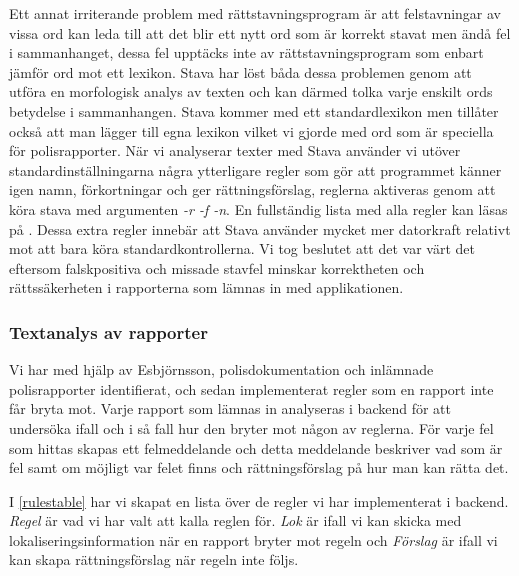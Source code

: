\documentclass[swedish]{maucsthesis}
\begin{document}
Ett annat irriterande problem med rättstavningsprogram är att felstavningar av
vissa ord kan leda till att det blir ett nytt ord som är korrekt stavat men ändå
fel i sammanhanget, dessa fel upptäcks inte av rättstavningsprogram som enbart
jämför ord mot ett lexikon. Stava har löst båda dessa problemen genom att utföra
en morfologisk analys av texten och kan därmed tolka varje enskilt ords
betydelse i sammanhangen. Stava kommer med ett standardlexikon men tillåter
också att man lägger till egna lexikon vilket vi gjorde med ord som är speciella
för polisrapporter. När vi analyserar texter med Stava använder vi utöver
standardinställningarna några ytterligare regler som gör att programmet känner igen
namn, förkortningar och ger rättningsförslag, reglerna aktiveras genom att köra stava med 
argumenten \textit{-r -f -n}. En fullständig lista med alla regler kan läsas på \cite{kann:2016}. Dessa extra regler innebär att
Stava använder mycket mer datorkraft relativt mot att bara köra
standardkontrollerna. Vi tog beslutet att det var värt det eftersom
falskpositiva och missade stavfel minskar korrektheten och rättssäkerheten i
rapporterna som lämnas in med applikationen. 

\subsubsection{Textanalys av rapporter}\label{textanalysavrapporter}

Vi har med hjälp av Esbjörnsson, polisdokumentation och inlämnade polisrapporter identifierat, och sedan implementerat
regler som en rapport inte får bryta mot. Varje rapport som lämnas in analyseras i backend för att undersöka
ifall och i så fall hur den bryter mot någon av reglerna.
För varje fel som hittas skapas ett felmeddelande och detta meddelande beskriver vad som är fel
samt om möjligt var felet finns och rättningsförslag på hur man kan rätta det.

I \cref{rulestable} har vi skapat en lista över de regler vi har implementerat i backend.
\textit{Regel} är vad vi har valt att kalla reglen för. \textit{Lok} är ifall vi kan skicka med 
lokaliseringsinformation när en rapport bryter mot regeln och \textit{Förslag} är ifall vi kan skapa 
rättningsförslag när regeln inte följs.
\end{document}
